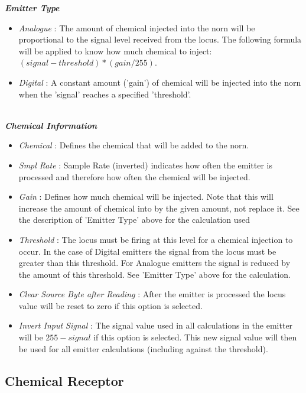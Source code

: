 \documentclass[11pt,twoside,a4paper]{article}
\begin{document}
\textbf{\textit{Emitter Type}}
\begin{itemize}
	\item[] \emph{Analogue} : The amount of chemical injected into the norn will be proportional to the signal level received from the locus. The following formula will be applied to know how much chemical to inject: $(signal - threshold) * (gain / 255)$.
	\item[] \emph{Digital} : A constant amount ('gain') of chemical will be injected into the norn when the 'signal' reaches a specified 'threshold'. 
\end{itemize}~\\

\textbf{\textit{Chemical Information}}
\begin{itemize}
	\item[] \emph{Chemical} : Defines the chemical that will be added to the norn.
	\item[] \emph{Smpl Rate} : Sample Rate (inverted) indicates how often the emitter is processed and therefore how often the chemical will be injected. %
	\item[] \emph{Gain} : Defines how much chemical will be injected. Note that this will increase the amount of chemical into by the given amount, not replace it. See the description of 'Emitter Type' above for the calculation used~\\
	\item[] \emph{Threshold} : The locus must be firing at this level for a chemical injection to occur. In the case of Digital emitters the signal from the locus must be greater than this threshold. For Analogue emitters the signal is reduced by the amount of this threshold. See 'Emitter Type' above for the calculation. 
	\item[] \emph{Clear Source Byte after Reading} : After the emitter is processed the locus value will be reset to zero if this option is selected.
	\item[] \textit{Invert Input Signal} : The signal value used in all calculations in the emitter will be $255-signal$ if this option is selected. This new signal value will then be used for all emitter calculations (including against the threshold).
\end{itemize}


\subsection{Chemical Receptor} %
\end{document}
